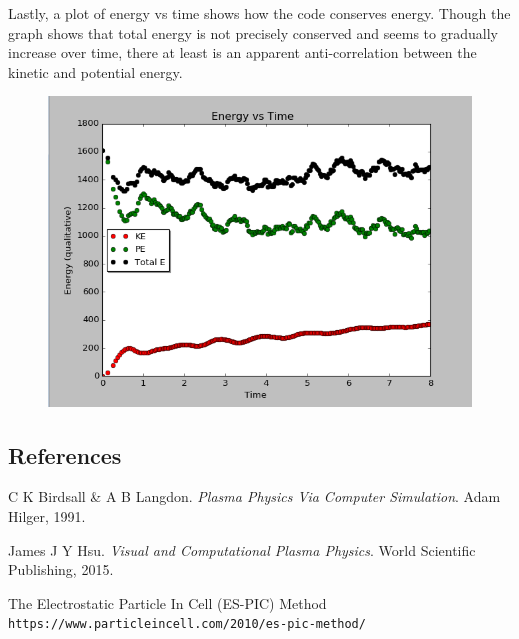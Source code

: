 \documentclass{article}
\begin{document}
Lastly, a plot of energy vs time shows how the code conserves energy. Though the graph shows that total energy is not precisely conserved and seems to gradually increase over time, there at least is an apparent anti-correlation between the kinetic and potential energy. 
\begin{figure}[H]
\begin{center}
\includegraphics[scale=0.8]{E_vs_t_NxNy31Npt1000.png}
\end{center}
\end{figure}


\subsection{References}
\begin{thebibliography}{9}
C K Birdsall & A B Langdon. 
\textit{Plasma Physics Via Computer Simulation}. 
Adam Hilger, 1991.
 
James J Y Hsu. 
\textit{Visual and Computational Plasma Physics}. 
World Scientific Publishing, 2015.
 
The Electrostatic Particle In Cell (ES-PIC) Method
\\\texttt{https://www.particleincell.com/2010/es-pic-method/}
\end{thebibliography}
\end{document}
